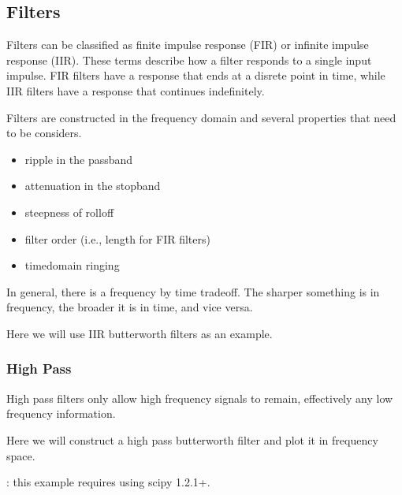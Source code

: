 \documentclass[letterpaper,10pt,english]{sphinxmanual}
\begin{document}
\subsection{Filters}
\label{\detokenize{content/Signal_Processing:filters}}
Filters can be classified as finite impulse response (FIR) or infinite impulse response (IIR). These terms describe how a filter responds to a single input impulse.  FIR filters have a response that ends at a disrete point in time, while IIR filters have a response that continues indefinitely.

Filters are constructed in the frequency domain and several properties that need to be considers.
\begin{itemize}
\item {} 
ripple in the pass\sphinxhyphen{}band

\item {} 
attenuation in the stop\sphinxhyphen{}band

\item {} 
steepness of roll\sphinxhyphen{}off

\item {} 
filter order (i.e., length for FIR filters)

\item {} 
time\sphinxhyphen{}domain ringing

\end{itemize}

In general, there is a frequency by time tradeoff.  The sharper something is in frequency, the broader it is in time, and vice versa.

Here we will use IIR butterworth filters as an example.


\subsubsection{High Pass}
\label{\detokenize{content/Signal_Processing:high-pass}}
High pass filters only allow high frequency signals to remain, effectively  any low frequency information.

Here we will construct a high pass butterworth filter and plot it in frequency space.

: this example requires using scipy 1.2.1+.
\end{document}
